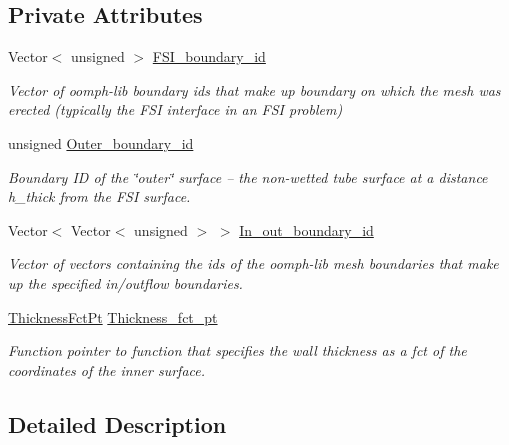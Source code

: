 \subsection*{Private Attributes}
\begin{DoxyCompactItemize}
\item 
Vector$<$ unsigned $>$ \hyperlink{classoomph_1_1ThinLayerBrickOnTetMesh_ad2b0a664fa1fc0f6f530740e40591212}{F\+S\+I\+\_\+boundary\+\_\+id}
\begin{DoxyCompactList}\small\item\em Vector of oomph-\/lib boundary ids that make up boundary on which the mesh was erected (typically the F\+SI interface in an F\+SI problem) \end{DoxyCompactList}\item 
unsigned \hyperlink{classoomph_1_1ThinLayerBrickOnTetMesh_a93acb15ee2a6fd52a21c31830b2a984b}{Outer\+\_\+boundary\+\_\+id}
\begin{DoxyCompactList}\small\item\em Boundary ID of the \char`\"{}outer\char`\"{} surface -- the non-\/wetted tube surface at a distance h\+\_\+thick from the F\+SI surface. \end{DoxyCompactList}\item 
Vector$<$ Vector$<$ unsigned $>$ $>$ \hyperlink{classoomph_1_1ThinLayerBrickOnTetMesh_aa8990092c886c1f5ac89b4476bf75b39}{In\+\_\+out\+\_\+boundary\+\_\+id}
\begin{DoxyCompactList}\small\item\em Vector of vectors containing the ids of the oomph-\/lib mesh boundaries that make up the specified in/outflow boundaries. \end{DoxyCompactList}\item 
\hyperlink{classoomph_1_1ThinLayerBrickOnTetMesh_aed34f7d1e9a5c6b5f3e220cb5bdf4550}{Thickness\+Fct\+Pt} \hyperlink{classoomph_1_1ThinLayerBrickOnTetMesh_a51d5c130c6b267fc8996e02d1172c81d}{Thickness\+\_\+fct\+\_\+pt}
\begin{DoxyCompactList}\small\item\em Function pointer to function that specifies the wall thickness as a fct of the coordinates of the inner surface. \end{DoxyCompactList}\end{DoxyCompactItemize}


\subsection{Detailed Description}
